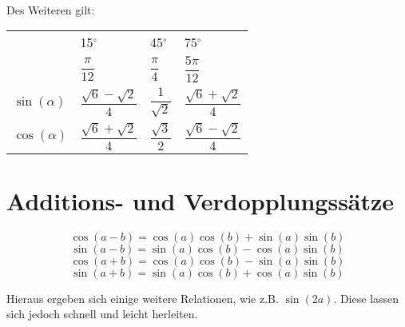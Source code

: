 \\
Des Weiteren gilt:\\
\begin{center}
  \begin{tabu} to 0.9\textwidth{| X[c] | X[c] | X[c] | X[c] |}
    \hline
    & 15$^\circ$ & 45$^\circ$ & 75$^\circ$\\
    & $\dfrac{\pi}{12}$ & $\dfrac{\pi}{4}$ & $\dfrac{5\pi}{12}$\\
    \hline
    $\sin(\alpha)$ & $\dfrac{\sqrt{6}-\sqrt{2}}{4}$ & $\dfrac{1}{\sqrt{2}}$ & $\dfrac{\sqrt{6}+\sqrt{2}}{4}$\\
    \hline
    $\cos(\alpha)$ & $\dfrac{\sqrt{6}+\sqrt{2}}{4}$ & $\dfrac{\sqrt{3}}{2}$ & $\dfrac{\sqrt{6}-\sqrt{2}}{4}$\\
    \hline
  \end{tabu}
\end{center}

\section{Additions- und Verdopplungssätze}
\begin{Theorem}
    $$\cos(a - b)  = \cos(a)\cos(b) + \sin(a)\sin(b)$$
    $$\sin(a - b)  = \sin(a)\cos(b) - \cos(a)\sin(b)$$
    $$\cos(a + b)  = \cos(a)\cos(b) - \sin(a)\sin(b)$$
    $$\sin(a + b)  = \sin(a)\cos(b) + \cos(a)\sin(b)$$
\end{Theorem}
\begin{Bemerkung}
  Hieraus ergeben sich einige weitere Relationen, wie z.B. $\sin(2a)$. Diese lassen sich jedoch schnell und leicht herleiten.
\end{Bemerkung}

